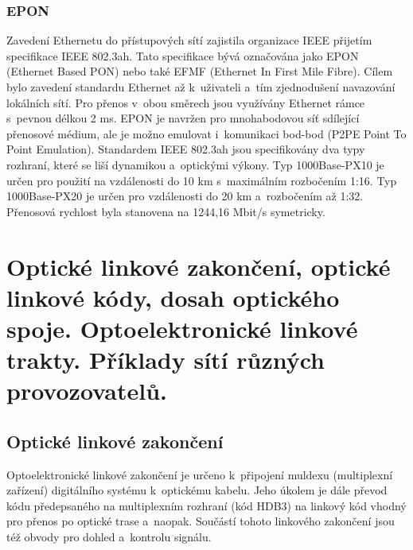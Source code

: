 \subsubsection{EPON}
Zavedení Ethernetu do přístupových sítí zajistila organizace IEEE přijetím specifikace IEEE 802.3ah. Tato specifikace bývá označována jako EPON (Ethernet Based PON) nebo také EFMF (Ethernet In First Mile Fibre). Cílem bylo zavedení standardu Ethernet až k~uživateli a~tím zjednodušení navazování lokálních sítí. Pro přenos v~obou směrech jsou využívány Ethernet rámce s~pevnou délkou 2 ms. EPON je navržen pro mnohabodovou síť sdílející přenosové médium, ale je možno emulovat i~komunikaci bod-bod (P2PE Point To Point Emulation). Standardem IEEE 802.3ah jsou specifikovány dva typy rozhraní, které se liší dynamikou a~optickými výkony. Typ 1000Base-PX10 je určen pro použití na vzdálenosti do 10 km s~maximálním rozbočením 1:16. Typ 1000Base-PX20 je určen pro vzdálenosti do 20 km a~rozbočením až 1:32. Přenosová rychlost byla stanovena na 1244,16 Mbit/s symetricky.

\clearpage
\section{Optické linkové zakončení, optické linkové kódy, dosah optického spoje. Optoelektronické linkové trakty. Příklady sítí různých provozovatelů.}

\subsection{Optické linkové zakončení}
Optoelektronické linkové zakončení je určeno k~připojení muldexu (multiplexní zařízení) digitálního systému k~optickému kabelu. Jeho úkolem je dále převod kódu předepsaného na multiplexním rozhraní (kód HDB3) na linkový kód vhodný pro přenos po optické trase a~naopak. Součástí tohoto linkového zakončení jsou též obvody pro dohled a~kontrolu signálu.

